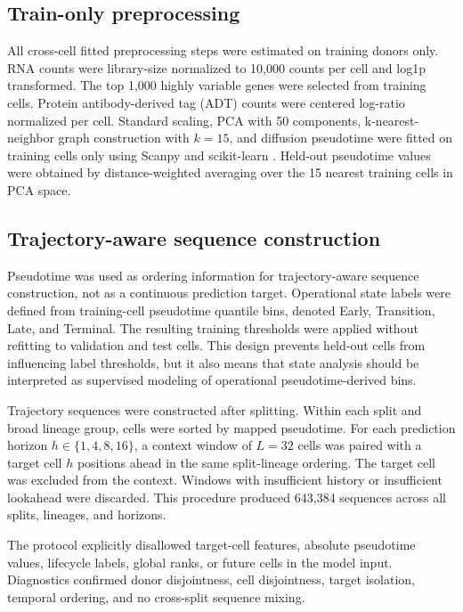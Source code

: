 \documentclass[11pt,twocolumn]{article}
\begin{document}
\subsection{Train-only preprocessing}

All cross-cell fitted preprocessing steps were estimated on training donors only. RNA counts were library-size normalized to 10,000 counts per cell and log1p transformed. The top 1,000 highly variable genes were selected from training cells. Protein antibody-derived tag (ADT) counts were centered log-ratio normalized per cell. Standard scaling, PCA with 50 components, k-nearest-neighbor graph construction with $k=15$, and diffusion pseudotime were fitted on training cells only using Scanpy and scikit-learn \citep{wolf2018,Pedregosa2011ScikitLearn}. Held-out pseudotime values were obtained by distance-weighted averaging over the 15 nearest training cells in PCA space.

\subsection{Trajectory-aware sequence construction}

Pseudotime was used as ordering information for trajectory-aware sequence construction, not as a continuous prediction target. Operational state labels were defined from training-cell pseudotime quantile bins, denoted Early, Transition, Late, and Terminal. The resulting training thresholds were applied without refitting to validation and test cells. This design prevents held-out cells from influencing label thresholds, but it also means that state analysis should be interpreted as supervised modeling of operational pseudotime-derived bins.

Trajectory sequences were constructed after splitting. Within each split and broad lineage group, cells were sorted by mapped pseudotime. For each prediction horizon $h \in \{1,4,8,16\}$, a context window of $L=32$ cells was paired with a target cell $h$ positions ahead in the same split-lineage ordering. The target cell was excluded from the context. Windows with insufficient history or insufficient lookahead were discarded. This procedure produced 643,384 sequences across all splits, lineages, and horizons.

The protocol explicitly disallowed target-cell features, absolute pseudotime values, lifecycle labels, global ranks, or future cells in the model input. Diagnostics confirmed donor disjointness, cell disjointness, target isolation, temporal ordering, and no cross-split sequence mixing.
\end{document}
